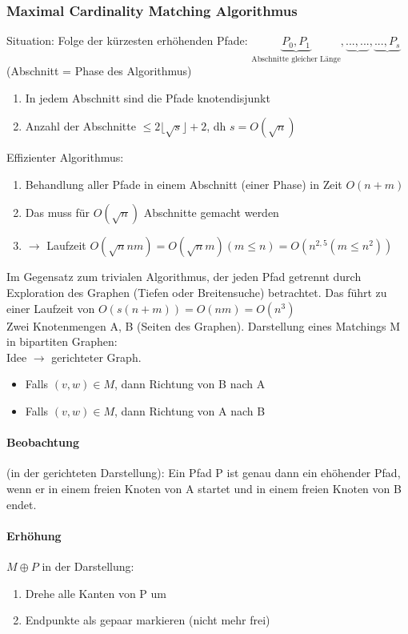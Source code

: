 \subsubsection{Maximal Cardinality Matching Algorithmus}
Situation: Folge der kürzesten erhöhenden Pfade: $ \underbrace{P_0,P_1}_{\text{Abschnitte gleicher Länge}},\underbrace{...,...},\underbrace{...,P_s}$ (Abschnitt = Phase des Algorithmus)
\begin{enumerate}
    \item In jedem Abschnitt sind die Pfade knotendisjunkt
    \item Anzahl der Abschnitte $ \leq 2 \lfloor \sqrt{s} \rfloor + 2 $, dh $ s=O(\sqrt{n}) $
\end{enumerate}
Effizienter Algorithmus:
\begin{enumerate}
    \item Behandlung aller Pfade in einem Abschnitt (einer Phase) in Zeit $ O(n+m) $
    \item Das muss für $ O(\sqrt{n}) $ Abschnitte gemacht werden
    \item[] $ \rightarrow $ Laufzeit $ O(\sqrt{n} nm)= O(\sqrt{n} m)  (m \leq n) = O(n^{2,5} (m \leq n^2))$
\end{enumerate}
Im Gegensatz zum trivialen Algorithmus, der jeden Pfad getrennt durch Exploration des Graphen (Tiefen oder Breitensuche) betrachtet. Das führt zu einer Laufzeit von $ O(s(n+m)) = O(nm) = O(n^3)$ \\

Zwei Knotenmengen A, B (Seiten des Graphen). Darstellung eines Matchings M in bipartiten Graphen: \\
Idee $ \rightarrow $ gerichteter Graph.
\begin{itemize}
    \item[] Falls $ (v,w) \in M $, dann Richtung von B nach A
    \item[] Falls $ (v,w) \in M $, dann Richtung von A nach B
\end{itemize}
\paragraph{Beobachtung} (in der gerichteten Darstellung): Ein Pfad P ist genau dann ein ehöhender Pfad, wenn er in einem freien Knoten von A startet und in einem freien Knoten von B endet.

\paragraph{Erhöhung} $ M \oplus P $ in der Darstellung:
\begin{enumerate}
    \item Drehe alle Kanten von P um
    \item Endpunkte als gepaar markieren (nicht mehr frei)
\end{enumerate}

